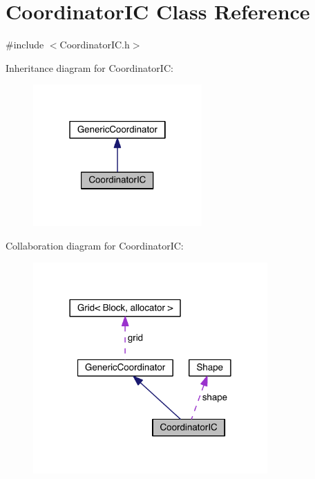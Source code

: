 \hypertarget{class_coordinator_i_c}{}\section{Coordinator\+I\+C Class Reference}
\label{class_coordinator_i_c}


{\ttfamily \#include $<$Coordinator\+I\+C.\+h$>$}



Inheritance diagram for Coordinator\+I\+C\+:\nopagebreak
\begin{figure}[H]
\begin{center}
\leavevmode
\includegraphics[width=183pt]{db/d5e/class_coordinator_i_c__inherit__graph}
\end{center}
\end{figure}


Collaboration diagram for Coordinator\+I\+C\+:\nopagebreak
\begin{figure}[H]
\begin{center}
\leavevmode
\includegraphics[width=254pt]{df/dc1/class_coordinator_i_c__coll__graph}
\end{center}
\end{figure}
